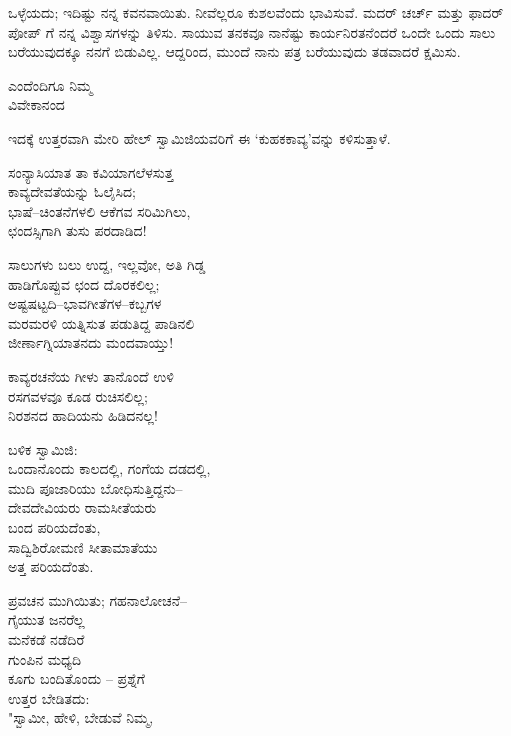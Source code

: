 ಒಳ್ಳೆಯದು; ಇದಿಷ್ಟು ನನ್ನ ಕವನವಾಯಿತು. ನೀವೆಲ್ಲರೂ ಕುಶಲವೆಂದು ಭಾವಿಸುವೆ. ಮದರ್ ಚರ್ಚ್ ಮತ್ತು ಫಾದರ್ ಪೋಪ್ ಗೆ ನನ್ನ ವಿಶ್ವಾಸಗಳನ್ನು ತಿಳಿಸು. ಸಾಯುವ ತನಕವೂ ನಾನೆಷ್ಟು ಕಾರ್ಯನಿರತನೆಂದರೆ ಒಂದೇ ಒಂದು ಸಾಲು ಬರೆಯುವುದಕ್ಕೂ ನನಗೆ ಬಿಡುವಿಲ್ಲ. ಆದ್ದರಿಂದ, ಮುಂದೆ ನಾನು ಪತ್ರ ಬರೆಯುವುದು ತಡವಾದರೆ ಕ್ಷಮಿಸು.

\begin{flushright}
ಎಂದೆಂದಿಗೂ ನಿಮ್ಮ\\ವಿವೇಕಾನಂದ
\end{flushright}

ಇದಕ್ಕೆ ಉತ್ತರವಾಗಿ ಮೇರಿ ಹೇಲ್ ಸ್ವಾಮಿಜಿಯವರಿಗೆ ಈ ‘ಕುಹಕಕಾವ್ಯ’ವನ್ನು ಕಳಿಸುತ್ತಾಳೆ.

\begin{myquote}
ಸಂನ್ಯಾಸಿಯಾತ ತಾ ಕವಿಯಾಗಲೆಳಸುತ್ತ\\ಕಾವ್ಯದೇವತೆಯನ್ನು ಓಲೈಸಿದ;\\ಭಾಷೆ–ಚಿಂತನೆಗಳಲಿ ಆಕೆಗವ ಸರಿಮಿಗಿಲು,\\ಛಂದಸ್ಸಿಗಾಗಿ ತುಸು ಪರದಾಡಿದ!
\end{myquote}

\begin{myquote}
ಸಾಲುಗಳು ಬಲು ಉದ್ದ, ಇಲ್ಲವೋ, ಅತಿ ಗಿಡ್ಡ\\ಹಾಡಿಗೊಪ್ಪುವ ಛಂದ ದೊರಕಲಿಲ್ಲ;\\ಅಷ್ಟಷಟ್ಟದಿ–ಭಾವಗೀತೆಗಳ–ಕಬ್ಬಗಳ\\ಮರಮರಳಿ ಯತ್ನಿಸುತ ಪಡುತಿದ್ದ ಪಾಡಿನಲಿ\\ಜೀರ್ಣಾಗ್ನಿಯಾತನದು ಮಂದವಾಯ್ತು!
\end{myquote}

\begin{myquote}
ಕಾವ್ಯರಚನೆಯ ಗೀಳು ತಾನೊಂದೆ ಉಳಿ\\ರಸಗವಳವೂ ಕೂಡ ರುಚಿಸಲಿಲ್ಲ;\\ನಿರಶನದ ಹಾದಿಯನು ಹಿಡಿದನಲ್ಲ!
\end{myquote}

\begin{myquote}
ಬಳಿಕ ಸ್ವಾಮಿಜಿ:\\ಒಂದಾನೊಂದು ಕಾಲದಲ್ಲಿ, ಗಂಗೆಯ ದಡದಲ್ಲಿ,\\ಮುದಿ ಪೂಜಾರಿಯು ಬೋಧಿಸುತ್ತಿದ್ದನು–\\ದೇವದೇವಿಯರು ರಾಮಸೀತೆಯರು\\ಬಂದ ಪರಿಯದೆಂತು,\\ಸಾದ್ವಿಶಿರೋಮಣಿ ಸೀತಾಮಾತೆಯು\\ಅತ್ತ ಪರಿಯದೆಂತು.
\end{myquote}

\begin{myquote}
ಪ್ರವಚನ ಮುಗಿಯಿತು; ಗಹನಾಲೋಚನೆ–\\ಗೈಯುತ ಜನರೆಲ್ಲ\\ಮನೆಕಡೆ ನಡೆದಿರೆ\\ಗುಂಪಿನ ಮಧ್ಯದಿ\\ಕೂಗು ಬಂದಿತೊಂದು – ಪ್ರಶ್ನೆಗೆ\\ಉತ್ತರ ಬೇಡಿತದು:\\"ಸ್ವಾಮೀ, ಹೇಳಿ, ಬೇಡುವೆ ನಿಮ್ಮ,
\end{myquote}

